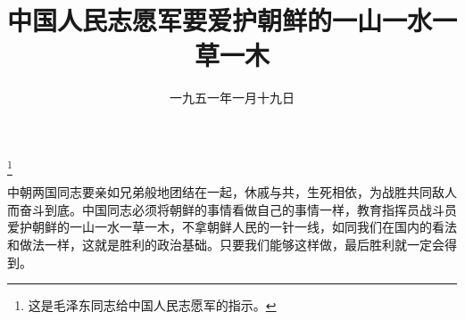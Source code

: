 
\title{中国人民志愿军要爱护朝鲜的一山一水一草一木}
\date{一九五一年一月十九日}
\thanks{这是毛泽东同志给中国人民志愿军的指示。}
\maketitle


中朝两国同志要亲如兄弟般地团结在一起，休戚与共，生死相依，为战胜共同敌人而奋斗到底。中国同志必须将朝鲜的事情看做自己的事情一样，教育指挥员战斗员爱护朝鲜的一山一水一草一木，不拿朝鲜人民的一针一线，如同我们在国内的看法和做法一样，这就是胜利的政治基础。只要我们能够这样做，最后胜利就一定会得到。

